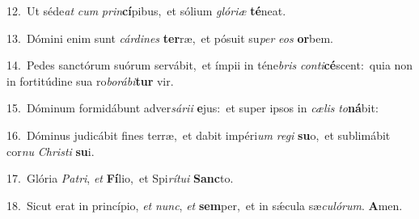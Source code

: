 {\numbfont\textcolor{\numbcolor}{12.}}~Ut séde\textit{at} \textit{cum} \textit{prin}\-\textbf{cí}pibus,~\star et sólium \textit{gló}\-\textit{ri}\textit{æ} \textbf{té}\-neat.\par
{\numbfont\textcolor{\numbcolor}{13.}}~Dómini enim sunt \textit{cár}\-\textit{di}\textit{nes} \textbf{ter}\-ræ,~\star et pósuit su\textit{per} \textit{e}\-\textit{os} \textbf{or}\-bem.\par
{\numbfont\textcolor{\numbcolor}{14.}}~Pedes sanctórum suórum servábit,~\dagger et ímpii in téne\textit{bris} \textit{con}\-\textit{ti}\textbf{cé}scent:~\star quia non in fortitúdine sua ro\-\textit{bo}\-\textit{rá}\textit{bi}\textbf{tur} vir.\par
{\numbfont\textcolor{\numbcolor}{15.}}~Dóminum formidábunt adver\-\textit{sá}\-\textit{ri}\textit{i} \textbf{e}\-jus:~\star et super ipsos in \textit{cæ}\-\textit{lis} \textit{to}\-\textbf{ná}bit:\par
{\numbfont\textcolor{\numbcolor}{16.}}~Dóminus judicábit fines terræ,~\dagger et dabit impéri\textit{um} \textit{re}\-\textit{gi} \textbf{su}\-o,~\star et sublimábit cor\textit{nu} \textit{Chris}\-\textit{ti} \textbf{su}\-i.\par
{\numbfont\textcolor{\numbcolor}{17.}}~Glória \textit{Pa}\-\textit{tri}, \textit{et} \textbf{Fí}\-lio,~\star et Spi\-\textit{rí}\-\textit{tu}\textit{i} \textbf{Sanc}\-to.\par
{\numbfont\textcolor{\numbcolor}{18.}}~Sicut erat in princípio, \textit{et} \textit{nunc}\-, \textit{et} \textbf{sem}\-per,~\star et in sǽcula sæ\-\textit{cu}\-\textit{ló}\textit{rum}. \textbf{A}\-men.\par
